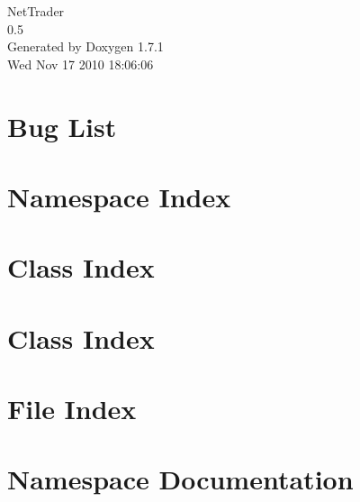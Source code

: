 \documentclass[a4paper]{article}
\begin{document}
\begin{titlepage}
\vspace*{7cm}
\begin{center}
{\Large NetTrader \\[1ex]\large 0.5 }\\
\vspace*{1cm}
{\large Generated by Doxygen 1.7.1}\\
\vspace*{0.5cm}
{\small Wed Nov 17 2010 18:06:06}\\
\end{center}
\end{titlepage}
\tableofcontents
{}
\section{Bug List}
\label{bug}

\section{Namespace Index}

\section{Class Index}

\section{Class Index}

\section{File Index}

\section{Namespace Documentation}

\end{document}
